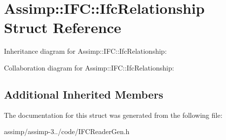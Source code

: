 \hypertarget{struct_assimp_1_1_i_f_c_1_1_ifc_relationship}{\section{Assimp\+:\+:I\+F\+C\+:\+:Ifc\+Relationship Struct Reference}
\label{struct_assimp_1_1_i_f_c_1_1_ifc_relationship}
}


Inheritance diagram for Assimp\+:\+:I\+F\+C\+:\+:Ifc\+Relationship\+:


Collaboration diagram for Assimp\+:\+:I\+F\+C\+:\+:Ifc\+Relationship\+:
\subsection*{Additional Inherited Members}


The documentation for this struct was generated from the following file\+:\begin{DoxyCompactItemize}
\item 
assimp/assimp-\/3../code/I\+F\+C\+Reader\+Gen.\+h\end{DoxyCompactItemize}
